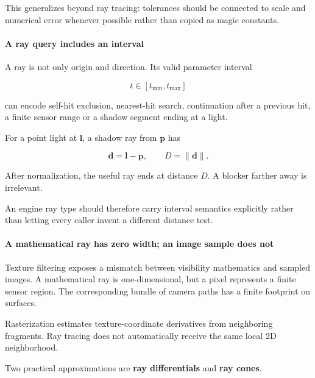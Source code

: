 This generalizes beyond ray tracing: tolerances should be connected to scale and numerical error whenever possible rather than copied as magic constants.

\paragraph{A ray query includes an interval}\label{03-visual-computing-i-ch001-a-ray-query-includes-an-interval}

\hypertarget{03-visual-computing-i-ch001-a-ray-query-includes-an-interval}{}

A ray is not only origin and direction. Its valid parameter interval

\[
t\in[t_{\min},t_{\max}]
\]

can encode self-hit exclusion, nearest-hit search, continuation after a previous hit, a finite sensor range or a shadow segment ending at a light.

For a point light at \(\mathbf l\), a shadow ray from \(\mathbf p\) has

\[
\mathbf d=\mathbf l-\mathbf p,
\qquad
D=\|\mathbf d\|.
\]

After normalization, the useful ray ends at distance \(D\). A blocker farther away is irrelevant.

An engine ray type should therefore carry interval semantics explicitly rather than letting every caller invent a different distance test.

\paragraph{A mathematical ray has zero width; an image sample does not}\label{03-visual-computing-i-ch001-a-mathematical-ray-has-zero-width-an-image-sample-does-not}

\hypertarget{03-visual-computing-i-ch001-a-mathematical-ray-has-zero-width-an-image-sample-does-not}{}

Texture filtering exposes a mismatch between visibility mathematics and sampled images. A mathematical ray is one-dimensional, but a pixel represents a finite sensor region. The corresponding bundle of camera paths has a finite footprint on surfaces.

Rasterization estimates texture-coordinate derivatives from neighboring fragments. Ray tracing does not automatically receive the same local 2D neighborhood.

Two practical approximations are \textbf{ray differentials} and \textbf{ray cones}.

